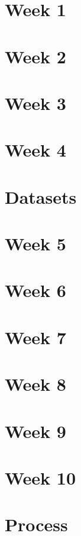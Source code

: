\documentclass{report}
\begin{document}
   \tableofcontents
   
   \chapter{Week 1}
   
   
   
   \chapter{Week 2}
   
   

    \chapter{Week 3}
    
    
    
    \chapter{Week 4}
    
    
    
     \chapter{Datasets}
     
     
     
     \chapter{Week 5}
     
     
     
     \chapter{Week 6}
     
     
     
     \chapter{Week 7}
     
     
     
     \chapter{Week 8}
     
     
     
     \chapter{Week 9}
     
     
     
     \chapter{Week 10}
     
     
     
     \chapter{Process}
     
     
     
     \printbibliography
\end{document}
